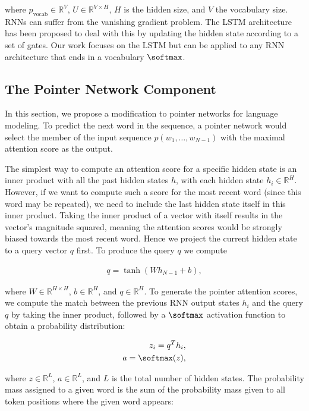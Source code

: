 where $p_{\text{vocab}} \in \mathbb{R}^V$, $U \in \mathbb{R}^{V \times H}$, $H$ is the hidden size, and $V$ the vocabulary size. RNNs can suffer from the vanishing gradient problem. The LSTM \cite{Hochreiter1997} architecture has been proposed to deal with this by updating the hidden state according to a set of gates. Our work focuses on the LSTM but can be applied to any RNN architecture that ends in a vocabulary $\softmax$.

\subsection{The Pointer Network Component} In this section, we propose a modification to pointer networks for language modeling. To predict the next word in the sequence, a pointer network would select the member of the input sequence $p(w_1, \ldots, w_{N-1})$ with the maximal attention score as the output.

The simplest way to compute an attention score for a specific hidden state is an inner product with all the past hidden states $h$, with each hidden state $h_i \in \mathbb{R}^H$.
However, if we want to compute such a score for the most recent word (since this word may be repeated), we need to include the last hidden state itself in this inner product. Taking the inner product of a vector with itself results in the vector's magnitude squared, meaning the attention scores would be strongly biased towards the most recent word. Hence we project the current hidden state to a query vector $q$ first. To produce the query $q$ we compute

\begin{align}
q = \tanh(W h_{N-1} + b),
\end{align}

where $W \in \mathbb{R}^{H \times H}$, $b \in \mathbb{R}^{H}$, and $q \in \mathbb{R}^H$.
To generate the pointer attention scores, we compute the match between the previous RNN output states $h_i$ and the query $q$ by taking the inner product, followed by a $\softmax$ activation function to obtain a probability distribution:

\begin{eqnarray}
z_i = q^T h_i, \label{eq:attn_z} \\
a = \softmax(z), \label{eq:attn_softmax}
\end{eqnarray}

where $z \in \mathbb{R}^L$,  $a \in \mathbb{R}^L$, and $L$ is the total number of hidden states. The probability mass assigned to a given word is the sum of the probability mass given to all token positions where the given word appears:

